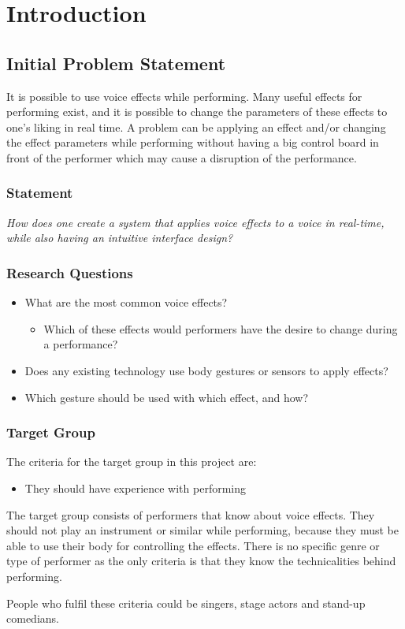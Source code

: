 \chapter{Introduction}\label{ch:Intro}

\section{Initial Problem Statement}

It is possible to use voice effects while performing. Many useful effects for performing exist, and it is possible to change the parameters of these effects to one's liking in real time. 
A problem can be applying an effect and/or changing the effect parameters while performing without having a big control board in front of the performer which may cause a disruption of the performance.

\subsection{Statement}

\textit{How does one create a system that applies voice effects to a voice in real-time, while also having an intuitive interface design?}


\subsection{Research Questions}\label{sub:ResearchQ}

\begin{itemize}
	\item What are the most common voice effects?
	\begin{itemize}
		\item Which of these effects would performers have the desire to change during a performance?
	\end{itemize}
	\item Does any existing technology use body gestures or sensors to apply effects?
	\item Which gesture should be used with which effect, and how?
\end{itemize}

\subsection{Target Group}
The criteria for the target group in this project are:

\begin{itemize}
	\item They should have experience with performing 
\end{itemize}

The target group consists of performers that know about voice effects. They should not play an instrument or similar while performing, because they must be able to use their body for controlling the effects. There is no specific genre or type of performer as the only criteria is that they know the technicalities behind performing.

People who fulfil these criteria could be singers, stage actors and stand-up comedians.